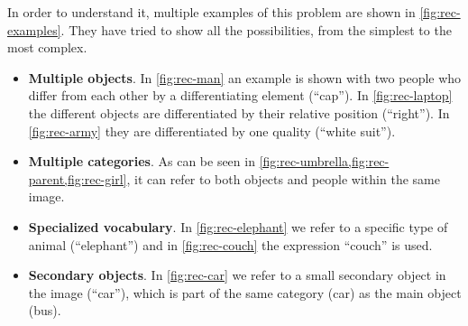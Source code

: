 In order to understand it, multiple examples of this problem are shown in
\vref{fig:rec-examples}. They have tried to show all the possibilities, from
the simplest to the most complex.
\begin{itemize}
  \item \textbf{Multiple objects}. In \vref{fig:rec-man} an example is shown
  with two people who differ from each other by a differentiating element
  (``cap''). In \vref{fig:rec-laptop} the different objects are differentiated
  by their relative position (``right''). In \vref{fig:rec-army} they are
  differentiated by one quality (``white suit'').
  \item \textbf{Multiple categories}. As can be seen in
  \vref{fig:rec-umbrella,fig:rec-parent,fig:rec-girl}, it can refer to both
  objects and people within the same image.
  \item \textbf{Specialized vocabulary}. In \vref{fig:rec-elephant} we refer to
  a specific type of animal (``elephant'') and in \vref{fig:rec-couch} the
  expression ``couch'' is used.
  \item \textbf{Secondary objects}. In \vref{fig:rec-car} we refer to a small
  secondary object in the image (``car''), which is part of the same category
  (car) as the main object (bus).
\end{itemize}

